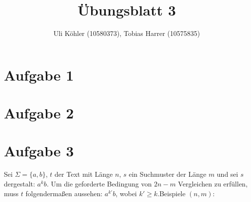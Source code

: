 \documentclass[a4paper,10pt,oneside,leqno]{scrartcl}
\title{Übungsblatt 3}
\author{Uli Köhler (10580373), Tobias Harrer (10575835)}
\begin{document}
\maketitle

\section*{Aufgabe 1}
\section*{Aufgabe 2}
\section*{Aufgabe 3}
Sei $\Sigma = \{a,b\}$, $t$ der Text mit Länge $n$, $s$ ein Suchmuster der Länge $m$ und sei $s$ dergestalt: $a^kb$. Um die geforderte
Bedingung von $2n -m$ Vergleichen zu erfüllen, muss $t$ folgendermaßen aussehen: $a^{k'}b$, wobei $k'\geq k$.\newline Beispiele $(n,m)$:\newline
\end{document}
